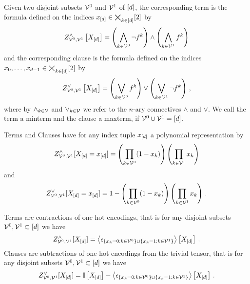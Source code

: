 \begin{definition}
    \label{def:clauses}
    Given two disjoint subsets $\mathcal{V}^{0}$ and $\mathcal{V}^{1}$ of $[d]$, the corresponding term is the formula defined on the indices $x_{[d]}\in\bigtimes_{k\in[d]}[2]$ by
    \begin{align*}
        Z^{\land}_{\mathcal{V}^{0},\mathcal{V}^{1}}\left[X_{[d]}\right]
        =\left( \bigwedge_{k\in\mathcal{V}^{0}} \lnot f^{k} \right)  \land \left( \bigwedge_{k\in\mathcal{V}^{1}} f^{k} \right)
    \end{align*}
    and the corresponding clause is the formula defined on the indices $x_{0},\ldots,x_{d-1}\in\bigtimes_{k\in[d]}[2]$ by
    \begin{align*}
        Z^{\lor}_{\mathcal{V}^{0},\mathcal{V}^{1}}\left[X_{[d]}\right]
        =\left( \bigvee_{k\in\mathcal{V}^{0}} f^{k} \right)  \lor \left( \bigvee_{k\in\mathcal{V}^{1}} \lnot f^{k} \right)  \, ,
    \end{align*}
    where by $\land_{k\in\mathcal{V}}$ and $\lor_{k\in\mathcal{V}}$ we refer to the $n$-ary connectives $\land$ and $\lor$.
    We call the term a minterm and the clause a maxterm, if $\mathcal{V}^{0}\cup\mathcal{V}^{1} = [d]$.
\end{definition}

Terms and Clauses have for any index tuple $x_{[d]}$ a polynomial representation by
\[ Z^{\land}_{\mathcal{V}^{0},\mathcal{V}^{1}}[X_{[d]}=x_{[d]}]
= \left( \prod_{k \in \mathcal{V}^{0}} (1-x_{k}) \right)
\left(  \prod_{k \in \mathcal{V}^{1}} x_{k} \right) \]
and
\[ Z^{\lor}_{\mathcal{V}^{0},\mathcal{V}^{1}}[X_{[d]}=x_{[d]}]
= 1 - \left( \prod_{k \in \mathcal{V}^{0}} (1-x_{k})\right)
\left(  \prod_{k \in \mathcal{V}^{1}} x_{k} \right) \, . \]


\begin{lemma}
    \label{lem:termClauseOneHot}
    Terms are contractions of one-hot encodings, that is for any disjoint subsets $\mathcal{V}^{0},\mathcal{V}^{1}\subset[d]$ we have
    \[ Z^{\land}_{\mathcal{V}^{0},\mathcal{V}^{1}}[X_{[d]}] = \left\langle \epsilon_{\{x_{k}=0 : k\in\mathcal{V}^{0} \} \cup \{x_{k}=1 : k\in\mathcal{V}^{1}\}}\right\rangle \left[ X_{[d]} \right] \, . \]
    Clauses are subtractions of one-hot encodings from the trivial tensor, that is for any disjoint subsets $\mathcal{V}^{0},\mathcal{V}^{1}\subset[d]$ we have
    \[ Z^{\lor}_{\mathcal{V}^{0},\mathcal{V}^{1}}[X_{[d]}] =
    \mathbb{I}\left[X_{[d]}\right] -
    \left\langle \epsilon_{\{x_{k}=0 : k\in\mathcal{V}^{0} \} \cup \{x_{k}=1 : k\in\mathcal{V}^{1}\}}\right\rangle \left[ X_{[d]} \right] \, . \]
\end{lemma}



